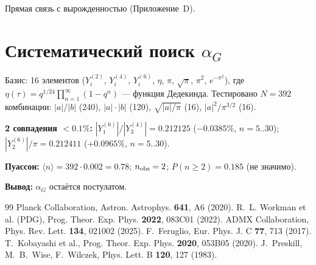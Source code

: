 \documentclass[12pt,a4paper]{article}
\numberwithin{equation}{section}
\begin{document}
Прямая связь с вырожденностью (Приложение~D).

\section{Систематический поиск $\alpha_G$}
\label{app:alpha-search}

Базис: 16 элементов ($Y^{(2)}_i$, $Y^{(4)}_i$, $Y^{(6)}_i$, $\eta$, $\pi$, $\sqrt\pi$, $\pi^2$, $e^{-\pi^2}$),
где $\eta(\tau) = q^{1/24}\prod_{n=1}^\infty (1-q^n)$ --- функция Дедекинда.
Тестировано $N = 392$ комбинации:
$|a|/|b|$ (240), $|a|\cdot|b|$ (120), $\sqrt{|a|/\pi}$ (16), $|a|^2/\pi^{3/2}$ (16).

\textbf{2 совпадения $<0.1\%$:}
$|Y^{(6)}_1|/|Y^{(4)}_3| = 0.212125$ ($-0.0385\%$, $n=5..30$);
$|Y^{(6)}_2|/\pi = 0.212411$ ($+0.0965\%$, $n=5..30$).

\textbf{Пуассон:} $\langle n\rangle = 392 \cdot 0.002 = 0.78$;
$n_{\rm obs} = 2$; $P(n \ge 2) = 0.185$ (не значимо).

\textbf{Вывод:} $\alpha_G$ остаётся постулатом.

\begin{thebibliography}{99}
 Planck Collaboration, Astron. Astrophys. \textbf{641}, A6 (2020).
 R.~L. Workman et al. (PDG), Prog. Theor. Exp. Phys. \textbf{2022}, 083C01 (2022).
 ADMX Collaboration, Phys. Rev. Lett. \textbf{134}, 021002 (2025).
 F.~Feruglio, Eur. Phys. J. C \textbf{77}, 713 (2017).
 T.~Kobayashi et al., Prog. Theor. Exp. Phys. \textbf{2020}, 053B05 (2020).
 J.~Preskill, M.~B.~Wise, F.~Wilczek, Phys. Lett. B \textbf{120}, 127 (1983).
\end{thebibliography}
\end{document}
